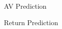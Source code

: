 \documentclass{beamer}
\begin{document}
\begin{frame}{AV Prediction}
	\vspace{-12pt}
	\begin{table}
		\begin{adjustbox}{width=\textwidth,height=4cm}
			
		\end{adjustbox}
		
	\end{table}
\end{frame}

\begin{frame}{Return Prediction}
	\vspace{-12pt}
	\begin{table}
		\begin{adjustbox}{width=\textwidth,height=4cm}
			
		\end{adjustbox}
		
	\end{table}
\end{frame}

%			
\end{document}
